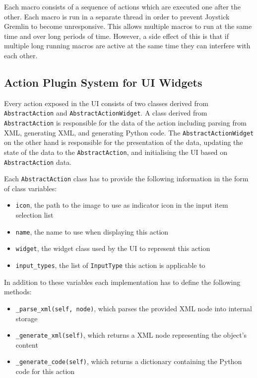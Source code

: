 \documentclass[a4, 10pt]{article}
\newcommand{\JG}{Joystick Gremlin}
\begin{document}
Each macro consists of a sequence of actions which are executed one
after the other. Each macro is run in a separate thread in order to
prevent \JG{} to become unresponsive. This allows multiple macros to run
at the same time and over long periods of time. However, a side effect
of this is that if multiple long running macros are active at the same
time they can interfere with each other.


\subsection{Action Plugin System for UI Widgets}

Every action exposed in the UI consists of two classes derived from
\texttt{Abstract\allowbreak Action} and \texttt{AbstractActionWidget}. A
class derived from \texttt{AbstractAction} is responsible for the data
of the action including parsing from XML, generating XML, and generating
Python code.  The \texttt{AbstractActionWidget} on the other hand is
responsible for the presentation of the data, updating the state of the
data to the \texttt{AbstractAction}, and initialising the UI based on
\texttt{AbstractAction} data.

Each \verb+AbstractAction+ class has to provide the following information
in the form of class variables:
\begin{itemize}
    \item \verb+icon+, the path to the image to use as indicator icon in
        the input item selection list
    \item \verb+name+, the name to use when displaying this action
    \item \verb+widget+, the widget class used by the UI to represent
        this action
    \item \verb+input_types+, the list of \verb+InputType+ this action
        is applicable to
\end{itemize}
In addition to these variables each implementation has to define the
following methods:
\begin{itemize}
    \item \verb+_parse_xml(self, node)+, which parses the provided XML
        node into internal storage
    \item \verb+_generate_xml(self)+, which returns a XML node
        representing the object's content
    \item \verb+_generate_code(self)+, which returns a dictionary
        containing the Python code for this action
\end{itemize}
\end{document}
